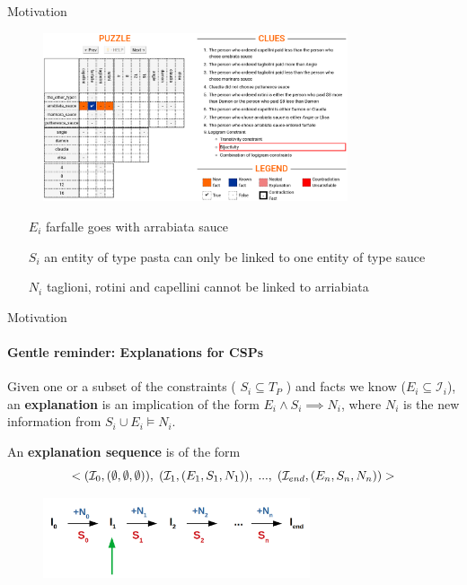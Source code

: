 \documentclass{beamer}
\begin{document}
	\begin{frame}{Motivation}
		\begin{figure}
			\includegraphics[width=0.8\textwidth]{logic_puzzles_bij.png}
		\end{figure}\pause
		\begin{itemize}
			\item[$E_i$] farfalle goes with arrabiata sauce \pause
			\item[$S_i$] an entity of type pasta can only be linked to one entity of type sauce\pause
			\item[$N_i$] taglioni, rotini and capellini cannot be linked to arriabiata
		\end{itemize}
		
	\end{frame}
	
	\newcommand\onestep{\ensuremath{\call{explain-One-Step}}\xspace}
	
		\begin{frame}{Motivation}
		\framesubtitle{Gentle reminder: Explanations for CSPs}
		\begin{definition}
			Given one or a subset of the constraints ( $S_i \subseteq T_P$  ) and facts we know ($E_i\subseteq \mathcal{I}_i$), an \textbf{explanation} is an implication of the form $E_i \wedge S_i  \implies N_i $, where $N_i$ is the new information from $S_i \cup E_i \models N_i$. \cite{bogaerts2020step}
		\end{definition} 
		
		An \textbf{explanation sequence} is of the form $$<(\mathcal{I}_0,(\emptyset,\emptyset,\emptyset)),\text{\hspace{3pt}}(\mathcal{I}_1,(E_1, S_1, N_1)),\text{\hspace{3pt}}...,\text{\hspace{3pt}}(\mathcal{I}_{end},(E_{n}, S_n, N_n ))>$$
		
		\begin{figure}
			\includegraphics[width=0.7\textwidth]{sequence_explanation2.png}
		\end{figure}
		
	\end{frame}
	
\end{document}
